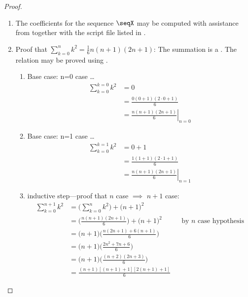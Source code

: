 \begin{proof}
\begin{enumerate}
  \item The coefficients for the sequence $\seqX$ may be computed with assistance from  
        together with the script file listed in .

  \item Proof that $\sum_{k=0}^{n}k^2 = \frac{1}{6}n(n+1)(2n+1)$: The summation is a . \label{item:Nn_powersum}
        The relation may be proved using .
    \begin{enumerate}
      \item Base case: n=0 case \ldots
        \begin{align*}
          \sum_{k=0}^{k=0} k^2 
            &= 0
          \\&= \frac{0(0+1)(2\cdot0+1)}{6}
          \\&= \left.\frac{n(n+1)(2n+1)}{6}\right|_{n=0} 
        \end{align*}

      \item Base case: n=1 case \ldots
        \begin{align*}
          \sum_{k=0}^{k=1} k^2 
            &= 0 + 1
          \\&= \frac{1(1+1)(2\cdot1+1)}{6}
          \\&= \left.\frac{n(n+1)(2n+1)}{6}\right|_{n=1} 
        \end{align*}

      \item inductive step---proof that $n$ case $\implies$ $n+1$ case:
        \begin{align*}
          \sum_{k=0}^{n+1} k^2
            &= \Bigg(\sum_{k=0}^n k^2\Bigg) + \Bigg(n+1\Bigg)^2
          \\&= \Bigg(\frac{n(n+1)(2n+1)}{6}\Bigg) + \Bigg(n+1\Bigg)^2
            && \text{by $n$ case hypothesis}
          \\&= \Bigg(n+1\Bigg)\Bigg(\frac{n(2n+1)+6(n+1)}{6}\Bigg) 
          \\&= \Bigg(n+1\Bigg)\Bigg(\frac{2n^2+7n+6}{6}\Bigg) 
          \\&= \Bigg(n+1\Bigg)\Bigg(\frac{(n+2)(2n+3)}{6}\Bigg) 
          \\&= \frac{(n+1)[(n+1)+1][2(n+1)+1]}{6} 
        \end{align*}
  \end{enumerate}
\end{enumerate}
\end{proof}
